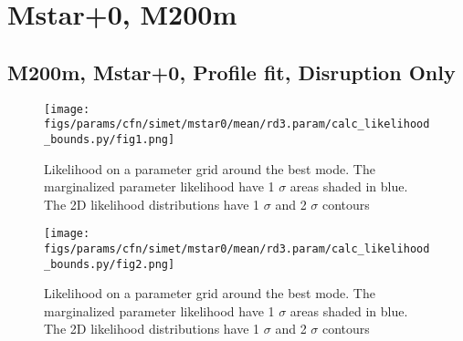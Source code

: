 \documentclass[twocolumn]{article}
\begin{document}







\onecolumn
\section{Mstar+0, M200m}
\subsection{M200m, Mstar+0, Profile fit, Disruption Only}
\begin{figure}[H]
  \center\texttt{[image: figs/params/cfn/simet/mstar0/mean/rd3.param/calc\_likelihood\_bounds.py/fig1.png]}
  \caption{Likelihood on a parameter grid around the best mode. The marginalized parameter likelihood have
    1 $\sigma$ areas shaded in blue. The 2D likelihood distributions have 1 $\sigma$  and 2 $\sigma$ contours}
  \label{fig:basic_rd:likelihood}
\end{figure}

\begin{figure}[H]
  \center\texttt{[image: figs/params/cfn/simet/mstar0/mean/rd3.param/calc\_likelihood\_bounds.py/fig2.png]}
  \caption{Likelihood on a parameter grid around the best mode. The marginalized parameter likelihood have
    1 $\sigma$ areas shaded in blue. The 2D likelihood distributions have 1 $\sigma$  and 2 $\sigma$ contours}
  \label{fig:basic_rd:likelihood}
\end{figure}
\end{document}
